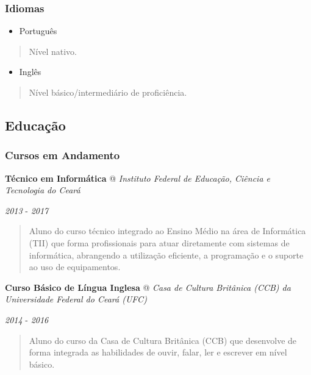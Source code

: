 \documentclass[]{article}
\providecommand{\tightlist}{%
  \setlength{\itemsep}{0pt}\setlength{\parskip}{0pt}}
\begin{document}
\subsubsection{Idiomas}\label{idiomas}

\begin{itemize}
\tightlist
\item
  Português
\end{itemize}

\begin{quote}
Nível nativo.
\end{quote}

\begin{itemize}
\tightlist
\item
  Inglês
\end{itemize}

\begin{quote}
Nível básico/intermediário de proficiência.
\end{quote}

\subsection{Educação}\label{educauxe7uxe3o}

\subsubsection{Cursos em Andamento}\label{cursos-em-andamento}

\textbf{Técnico em Informática} @ \emph{Instituto Federal de Educação,
Ciência e Tecnologia do Ceará}

\emph{2013} - \emph{2017}

\begin{quote}
Aluno do curso técnico integrado ao Ensino Médio na área de Informática
(TII) que forma profissionais para atuar diretamente com sistemas de
informática, abrangendo a utilização eficiente, a programação e o
suporte ao uso de equipamentos.
\end{quote}

\textbf{Curso Básico de Língua Inglesa} @ \emph{Casa de Cultura
Britânica (CCB) da Universidade Federal do Ceará (UFC)}

\emph{2014} - \emph{2016}

\begin{quote}
Aluno do curso da Casa de Cultura Britânica (CCB) que desenvolve de
forma integrada as habilidades de ouvir, falar, ler e escrever em nível
básico.
\end{quote}
\end{document}
